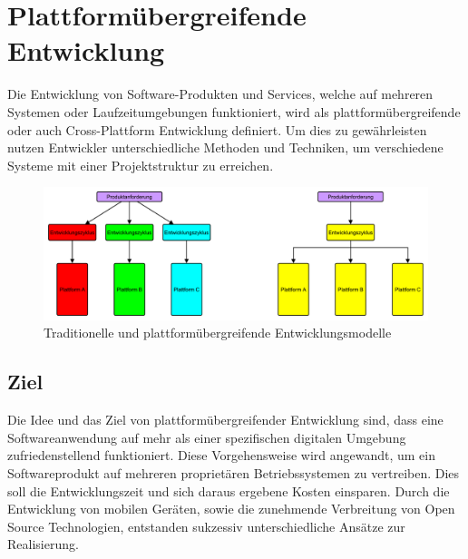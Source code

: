 
\chapter{Plattformübergreifende Entwicklung}
Die Entwicklung von Software-Produkten und Services, welche auf mehreren Systemen oder Laufzeitumgebungen funktioniert, wird als plattformübergreifende oder auch Cross-Plattform Entwicklung definiert. Um dies zu gewährleisten nutzen Entwickler unterschiedliche Methoden und Techniken, um verschiedene Systeme mit einer Projektstruktur zu erreichen.\citep{cross_plattform_explanation}

\begin{figure}[htbp]
	\centering
	\includegraphics[width=1\textwidth]{Bilder/nativ_vs_cross}
	\caption{Traditionelle und plattformübergreifende Entwicklungsmodelle}\label{graph_nativ_vs_cross}
\end{figure}


\section{Ziel}
Die Idee und das Ziel von plattformübergreifender Entwicklung sind, dass eine Softwareanwendung auf mehr als einer spezifischen digitalen Umgebung zufriedenstellend funktioniert. Diese Vorgehensweise wird angewandt, um ein Softwareprodukt auf mehreren proprietären Betriebssystemen zu vertreiben. Dies soll die Entwicklungszeit und sich daraus ergebene Kosten einsparen. Durch die Entwicklung von mobilen Geräten, sowie die zunehmende Verbreitung von Open Source Technologien, entstanden sukzessiv unterschiedliche Ansätze zur Realisierung.


